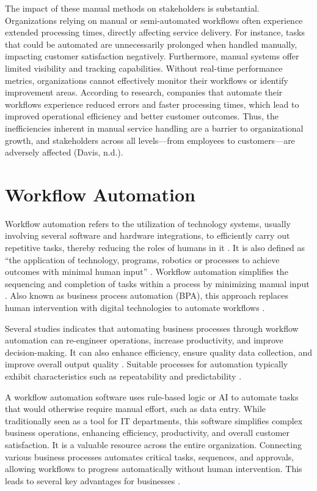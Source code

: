 The impact of these manual methods on stakeholders is substantial. Organizations relying on manual or semi-automated workflows often experience extended processing times, directly affecting service delivery. For instance, tasks that could be automated are unnecessarily prolonged when handled manually, impacting customer satisfaction negatively. Furthermore, manual systems offer limited visibility and tracking capabilities. Without real-time performance metrics, organizations cannot effectively monitor their workflows or identify improvement areas. According to research, companies that automate their workflows experience reduced errors and faster processing times, which lead to improved operational efficiency and better customer outcomes. Thus, the inefficiencies inherent in manual service handling are a barrier to organizational growth, and stakeholders across all levels—from employees to customers—are adversely affected (Davis, n.d.).

\section{Workflow Automation}

Workflow automation refers to the utilization of technology systems, usually involving several software and hardware integrations, to efficiently carry out repetitive tasks, thereby reducing the roles of humans in it \cite{winarko2021}. It is also defined as “the application of technology, programs, robotics or processes to achieve outcomes with minimal human input” \cite{ibm}. Workflow automation simplifies the sequencing and completion of tasks within a process by minimizing manual input  \cite{astera2024}. Also known as business process automation (BPA), this approach replaces human intervention with digital technologies to automate workflows \cite{thomas2024}.  

Several studies indicates that automating business processes through workflow automation can re-engineer operations, increase productivity, and improve decision-making\cite{abecker2000, aversano2002}. It can also enhance efficiency, ensure quality data collection, and improve overall output quality \cite{pakdil2009}. Suitable processes for automation typically exhibit characteristics such as repeatability and predictability \cite{basu2002}. 

A workflow automation software uses rule-based logic or AI to automate tasks that would otherwise require manual effort, such as data entry. While traditionally seen as a tool for IT departments, this software simplifies complex business operations, enhancing efficiency, productivity, and overall customer satisfaction. It is a valuable resource across the entire organization. Connecting various business processes automates critical tasks, sequences, and approvals, allowing workflows to progress automatically without human intervention. This leads to several key advantages for businesses \cite{servicenow}.

